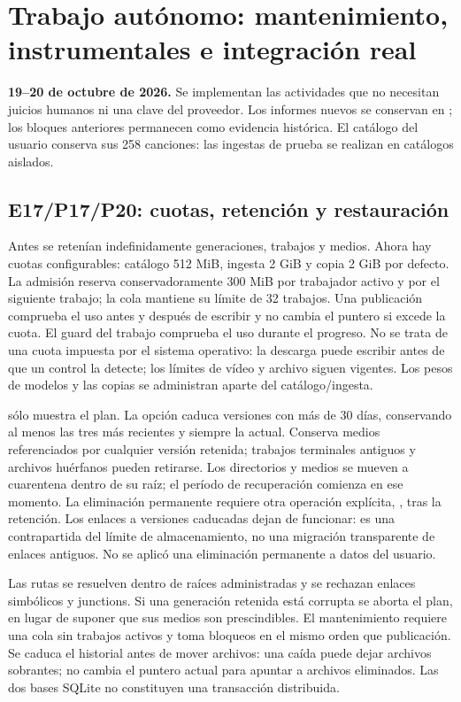 \section{Trabajo autónomo: mantenimiento, instrumentales e integración real}
\label{sec:autonomo}
\textbf{19--20 de octubre de 2026.} Se implementan las actividades que no necesitan
juicios humanos ni una clave del proveedor. Los informes nuevos se conservan en
; los bloques anteriores permanecen como evidencia
histórica. El catálogo del usuario conserva sus 258 canciones: las ingestas de
prueba se realizan en catálogos aislados.

\subsection{E17/P17/P20: cuotas, retención y restauración}
Antes se retenían indefinidamente generaciones, trabajos y medios. Ahora hay
cuotas configurables: catálogo 512 MiB, ingesta 2 GiB y copia 2 GiB por defecto.
La admisión reserva conservadoramente 300 MiB por trabajador activo y por el
siguiente trabajo; la cola mantiene su límite de 32 trabajos. Una publicación
comprueba el uso antes y después de escribir y no cambia el puntero si excede
la cuota. El guard del trabajo comprueba el uso durante el progreso. No se trata
de una cuota impuesta por el sistema operativo: la descarga puede escribir antes
de que un control la detecte; los límites de vídeo y archivo siguen vigentes.
Los pesos de modelos y las copias se administran aparte del catálogo/ingesta.

 sólo muestra el plan. La opción
 caduca versiones con más de 30 días, conservando al menos las tres
más recientes y siempre la actual. Conserva medios referenciados por cualquier
versión retenida; trabajos terminales antiguos y archivos huérfanos pueden
retirarse. Los directorios y medios se mueven a cuarentena dentro de su raíz;
el período de recuperación comienza en ese momento. La eliminación permanente
requiere otra operación explícita, , tras la retención.
Los enlaces a versiones caducadas dejan de funcionar: es una contrapartida
del límite de almacenamiento, no una migración transparente de enlaces antiguos.
No se aplicó una eliminación permanente a datos del usuario.

Las rutas se resuelven dentro de raíces administradas y se rechazan enlaces
simbólicos y junctions. Si una generación retenida está corrupta se aborta el
plan, en lugar de suponer que sus medios son prescindibles. El mantenimiento
requiere una cola sin trabajos activos y toma bloqueos en el mismo orden que
publicación. Se caduca el historial antes de mover archivos: una caída puede
dejar archivos sobrantes; no cambia el puntero actual para apuntar a archivos
eliminados. Las dos bases SQLite no constituyen una transacción distribuida.

